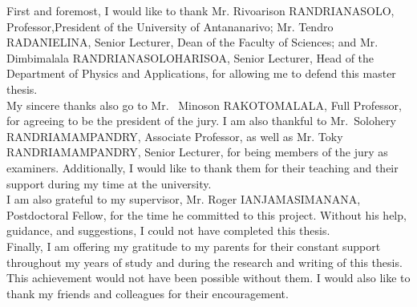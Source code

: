 \indent \justifying First and foremost, I would like to thank Mr. Rivoarison RANDRIANASOLO, Professor,\linebreak President of the University of Antananarivo; Mr. Tendro RADANIELINA, Senior Lecturer, Dean of the Faculty of Sciences; and Mr. Dimbimalala RANDRIANASOLOHARISOA, Senior Lecturer, Head of the Department of Physics and Applications, for allowing me to defend this master thesis.\\

\indent My sincere thanks also go to Mr. ~Minoson RAKOTOMALALA, Full Professor, for agreeing to be the president of the jury. I am also thankful to Mr.~Solohery RANDRIAMAMPANDRY, Associate Professor, as well as Mr. Toky RANDRIAMAMPANDRY, Senior Lecturer, for being members of the jury as examiners. Additionally, I would like to thank them for their teaching and their support during my time at the university.\\

\indent I am also grateful to my supervisor, Mr. Roger IANJAMASIMANANA, Postdoctoral Fellow, for the time he committed to this project. Without his help, guidance, and suggestions, I could not have completed this thesis.\\

\indent Finally, I am offering my gratitude to my parents for their constant support throughout my years of study and during the research and writing of this thesis. This achievement would not have been possible without them. I would also like to thank my friends and colleagues for their encouragement.